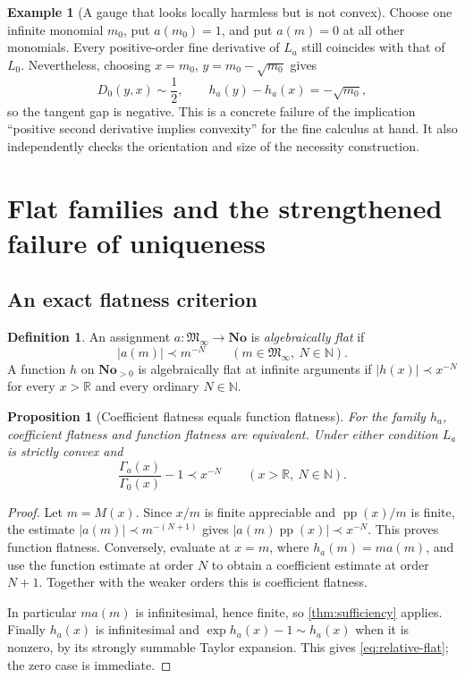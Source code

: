 \documentclass[11pt,letterpaper]{article}
\numberwithin{equation}{section}
\theoremstyle{plain}
\newtheorem{proposition}[proposition]{Proposition}
\theoremstyle{definition}
\newtheorem{definition}[definition]{Definition}
\newtheorem{example}[example]{Example}
\theoremstyle{remark}
\newcommand{\No}{\mathbf{No}}
\newcommand{\R}{\mathbb R}
\newcommand{\N}{\mathbb N}
\newcommand{\Minf}{\mathfrak M_{\infty}}
\newcommand{\pp}{\operatorname{pp}}
\newcommand{\abs}[1]{\lvert#1\rvert}
\begin{document}
\begin{example}[A gauge that looks locally harmless but is not convex]
Choose one infinite monomial $m_0$, put $a(m_0)=1$, and put $a(m)=0$ at
all other monomials. Every positive-order fine derivative of $L_a$ still
coincides with that of $L_0$. Nevertheless, choosing
$x=m_0$, $y=m_0-\sqrt{m_0}$ gives
\[
 D_0(y,x)\sim\frac12,\qquad h_a(y)-h_a(x)=-\sqrt{m_0},
\]
so the tangent gap is negative. This is a concrete failure of the implication
``positive second derivative implies convexity'' for the fine calculus at
hand. It also independently checks the orientation and size of the
necessity construction.
\end{example}

\section{Flat families and the strengthened failure of uniqueness}\label{sec:flat}

\subsection{An exact flatness criterion}
\begin{definition}
An assignment $a:\Minf\to\No$ is \emph{algebraically flat} if
\[
 \abs{a(m)}\prec m^{-N}\qquad(m\in\Minf,\ N\in\N).
\]
A function $h$ on $\No_{>0}$ is algebraically flat at infinite arguments if
$\abs{h(x)}\prec x^{-N}$ for every $x>\R$ and every ordinary $N\in\N$.
\end{definition}

\begin{proposition}[Coefficient flatness equals function flatness]
\label{prop:flat-equivalence}
For the family $h_a$, coefficient flatness and function flatness are
equivalent. Under either condition $L_a$ is strictly convex and
\begin{equation}\label{eq:relative-flat}
 \frac{\Gamma_a(x)}{\Gamma_0(x)}-1\prec x^{-N}
 \qquad(x>\R,\ N\in\N).
\end{equation}
\end{proposition}
\begin{proof}
Let $m=M(x)$. Since $x/m$ is finite appreciable and
$\pp(x)/m$ is finite, the estimate
$\abs{a(m)}\prec m^{-(N+1)}$ gives
$\abs{a(m)\pp(x)}\prec x^{-N}$. This proves function flatness.
Conversely, evaluate at $x=m$, where $h_a(m)=m a(m)$, and use the
function estimate at order $N$ to obtain a coefficient estimate at order
$N+1$. Together with the weaker orders this is coefficient flatness.

In particular $m a(m)$ is infinitesimal, hence finite, so
\cref{thm:sufficiency} applies. Finally $h_a(x)$ is infinitesimal and
$\exp h_a(x)-1\sim h_a(x)$ when it is nonzero, by its strongly summable
Taylor expansion. This gives \eqref{eq:relative-flat}; the zero case is
immediate.
\end{proof}
\end{document}

